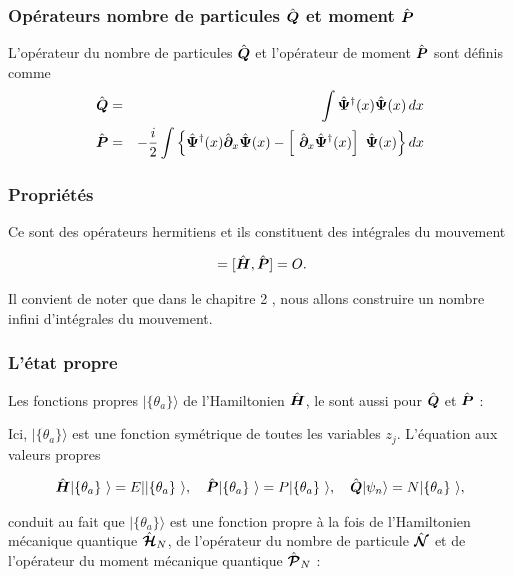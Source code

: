 \subsubsection{Opérateurs nombre de particules $\hat{\bm{Q}}$ et moment $\hat{\bm{P}}$}
L'opérateur du nombre de particules $\hat{\bm{Q}}$ et l'opérateur de moment $\hat{\bm{P}}$ sont définis comme 
\begin{eqnarray}
	\operator{Q} & = & \int \operator{\Psi}^\dag (x) \operator{\Psi} (x) \, d x \\
	\operator{P} & = & - \frac{i}2 \int \left \{  \operator{\Psi}^\dag(x) \operator{\partial}_x \operator{\Psi}(x) - \left [ \operator{\partial}_x \operator{\Psi}^\dag(x)\right ] \operator{\Psi}(x)\right \} dx \label{eq.1.7}
\end{eqnarray}

\subsubsection{Propriétés}

Ce sont des opérateurs hermitiens et ils constituent des intégrales du mouvement

\begin{eqnarray}
	[ \operator{H} , \operator{Q} ] = 	[ \operator{H} , \operator{P} ] = O. 
\end{eqnarray}

Il convient de noter que dans le chapitre 2 , nous allons construire un nombre infini d'intégrales du mouvement.

\subsubsection{L’état propre}

Les fonctions propres $\vert \{\theta_a\} \rangle$ de l'Hamiltonien $\hat{\bm{H}}$, le sont aussi pour $\hat{\bm{Q}}$ et $\hat{\bm{P}}$ :

Ici, $\vert \{\theta_a\} \rangle$ est une fonction symétrique de toutes les variables $z_j$. L'équation aux valeurs propres 

\begin{eqnarray}
	\operator{H} \vert \{\theta_a\} \rangle = E |\vert \{\theta_a\} \rangle, \quad \operator{P} \vert \{\theta_a\} \rangle = P \vert \{\theta_a\} \rangle, \quad \operator{Q} |\psi_n\rangle = N \vert \{\theta_a\} \rangle,	
\end{eqnarray}

conduit au fait que $\vert \{\theta_a\} \rangle$ est une fonction propre à la fois de l'Hamiltonien mécanique quantique $\hat{\bm{\mathcal{H}}}_N$, de l'opérateur du nombre de particule $\hat{\bm{\mathcal{N}}}$ et de l'opérateur du moment mécanique quantique $\hat{\bm{\mathcal{P}}}_N$ :

